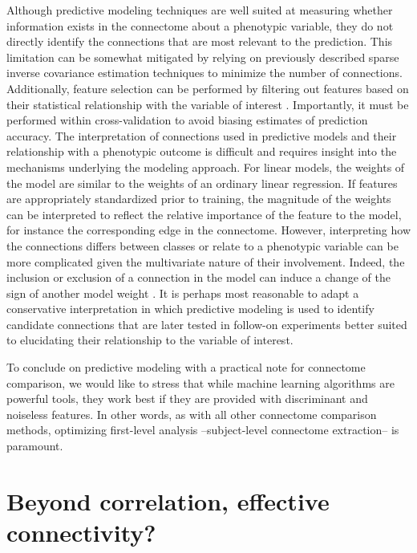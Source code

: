 \documentclass[5p]{elsarticle}
\begin{document}
Although predictive modeling techniques are well suited at measuring whether
information exists in the connectome about a phenotypic variable, they do
not directly identify the connections that are most relevant to the
prediction.  This limitation can be somewhat mitigated  by
relying on previously described sparse inverse covariance estimation techniques to minimize
the number of connections. Additionally, feature selection \cite{guyon2003} 
can be performed by filtering out
features based on their statistical relationship with the variable of interest
\cite{craddock2009, shen2010}. Importantly, it must be performed within
cross-validation to avoid biasing estimates of prediction accuracy.
% 
The interpretation of connections used in predictive models and their
relationship with
a phenotypic outcome is difficult and requires insight into the mechanisms
underlying the modeling approach. For linear models, the weights of the
model are similar to the weights of
an ordinary linear regression. If features are appropriately standardized
prior to training, the magnitude of the weights can be interpreted to reflect
the relative importance of the feature to the model, for instance the
corresponding edge in the connectome. However,
interpreting how the connections differs between classes or relate to a
phenotypic variable can be more complicated given the multivariate nature
of their involvement.
Indeed, the inclusion or exclusion of a connection in the model
can induce a change of the sign of another model weight \cite{craddock2009}.
 It
is perhaps most reasonable to adapt a conservative interpretation in which
predictive modeling is used to identify candidate connections that are later
tested in follow-on experiments better suited to elucidating their relationship
to the variable of interest.

To conclude on predictive modeling with a practical note for connectome
comparison, we would like to stress that while machine learning algorithms are
powerful tools, they work best if they are provided with discriminant and
noiseless features. In other words, as with all other connectome comparison
methods, optimizing first-level analysis --subject-level connectome extraction--
is paramount.


\section{Beyond correlation, effective connectivity?}
\end{document}
